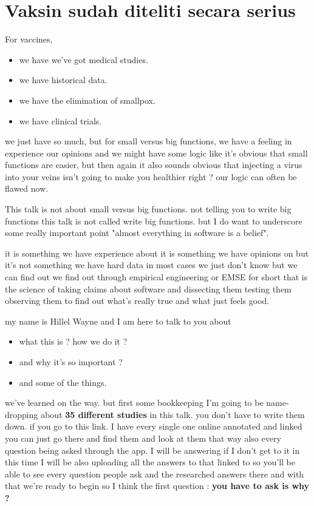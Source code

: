 \documentclass[14pt]{extreport}
\begin{document}
\section{Vaksin sudah diteliti secara serius}
For vaccines, 
\begin{itemize}
	\item we have we've got medical studies.
	\item we have historical data. 
	\item we have the elimination of smallpox.
	\item we have clinical trials. 
\end{itemize}

we just have so much, but for small versus big functions, we have a feeling in experience our opinions and we might have some logic like it's obvious that small functions are easier, but then again it also sounds obvious that injecting a virus into your veins isn't going to make you healthier right ? 
our logic can often be flawed now. \par

This talk is not about small versus big functions.  not telling you to write big functions this talk is not called write big functions.
but I do want to underscore some really important point "almost everything in software is a belief". 

it is something we have experience about it is something we have
opinions on but it's not something we
have hard data in most cases we just
don't know but we can find out we find
out through empirical engineering or EMSE
for short that is the science of taking
claims about software and dissecting
them testing them observing them to find
out what's really true and what just
feels good. \par
my name is Hillel Wayne and I am here to talk to you about 
\begin{itemize}
	\item what this is ? how we do it ? 
	\item and why it's so important  ?
	\item and some of the things.
\end{itemize}

we've learned on the way. 
but first some bookkeeping I'm going to be
name-dropping about \textbf{35 different studies} in this talk. 
you don't have to write them down.
if you go to this link.
I have every single one online annotated and linked you can just go there and find
them and look at them that way also every question being asked through the app.
I will be answering if I don't get to it in this time I will be also
uploading all the answers to that linked
to so you'll be able to see every
question people ask and the researched
answers there and with that we're ready
to begin so 
I think the first question : \textbf{you have to ask is why ?}
\end{document}
